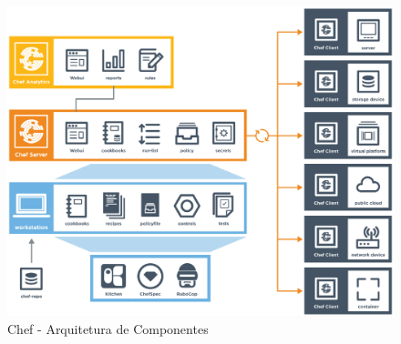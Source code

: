 \begin{figure}[h]
  \label{fig:arch_chef}
  \centering
  \includegraphics[width=\textwidth]{figuras/arch_chef.eps}
  \caption{Chef - Arquitetura de Componentes}
\end{figure}


